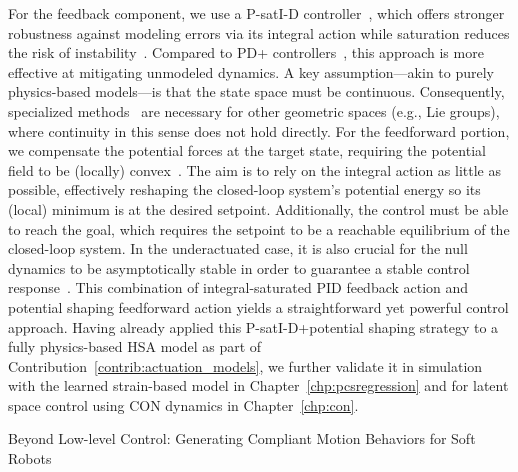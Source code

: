 %
For the feedback component, we use a P-satI-D controller~\cite{pustina2022p}, which offers stronger robustness against modeling errors via its integral action while saturation reduces the risk of instability~\cite{pustina2022p}. Compared to PD+ controllers~\cite{della2020model}, this approach is more effective at mitigating unmodeled dynamics.
%
A key assumption—akin to purely physics-based models—is that the state space must be continuous. Consequently, specialized methods~\cite{maithripala2015intrinsic} are necessary for other geometric spaces (e.g., Lie groups), where continuity in this sense does not hold directly.
%
For the feedforward portion, we compensate the potential forces at the target state, requiring the potential field to be (locally) convex~\cite{borja2022energy, della2023model}. The aim is to rely on the integral action as little as possible, effectively reshaping the closed-loop system’s potential energy so its (local) minimum is at the desired setpoint. 
Additionally, the control must be able to reach the goal, which requires the setpoint to be a reachable equilibrium of the closed-loop system. In the underactuated case, it is also crucial for the null dynamics to be asymptotically stable in order to guarantee a stable control response~\cite{borja2022energy}.
%
This combination of integral-saturated PID feedback action and potential shaping feedforward action yields a straightforward yet powerful control approach.
%
Having already applied this P-satI-D+potential shaping strategy to a fully physics-based \gls{HSA} model as part of Contribution~\ref{contrib:actuation_models}, we further validate it in simulation with the learned strain-based model in Chapter~\ref{chp:pcsregression} and for latent space control using \gls{CON} dynamics in Chapter~\ref{chp:con}.


\begin{contribution}\label{contrib:motion_behaviors}
    Beyond Low-level Control: Generating Compliant Motion Behaviors for Soft Robots
\end{contribution}

